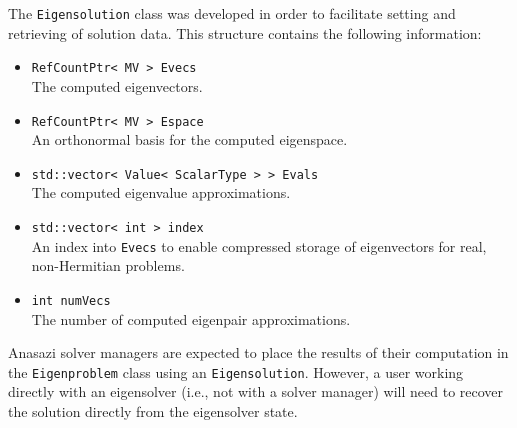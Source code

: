 \documentclass[acmtoms]{acmtrans2m}
\newcommand{\aspace}[1]{\texttt{#1}}
\begin{document}
The \aspace{Eigensolution} class was developed in order to
facilitate setting and retrieving of solution data. This structure
contains the following information:
\begin{itemize}
  \item \verb!RefCountPtr< MV > Evecs! \\
   The computed eigenvectors.
 \item \verb!RefCountPtr< MV > Espace! \\
   An orthonormal basis for the computed eigenspace.
 \item \verb!std::vector< Value< ScalarType > > Evals! \\
   The computed eigenvalue approximations.
 \item \verb!std::vector< int > index! \\
   An index into \verb!Evecs! to enable compressed storage of eigenvectors for real, non-Hermitian problems.
 \item \verb!int numVecs! \\
   The number of computed eigenpair approximations.
\end{itemize}

Anasazi solver managers are expected to place the results of their computation in the
\aspace{Eigenproblem} class using an \aspace{Eigensolution}. However, a user working
directly with an eigensolver (i.e., not with a solver manager) will need to recover the
solution directly from the eigensolver state.


\end{document}
